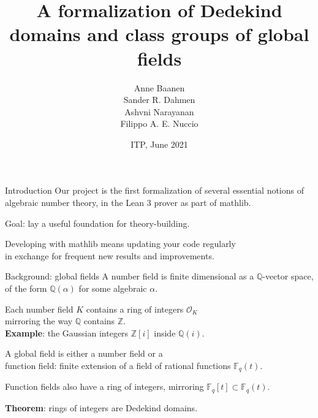 \documentclass{beamer}
\title{A formalization of Dedekind domains and class groups of global fields}
\author{Anne Baanen \\ Sander R. Dahmen \\ Ashvni Narayanan \\ Filippo A. E. Nuccio}
\date{ITP, June 2021}
\newcommand*{\OK}[1][K]{\mathcal{O}_{#1}}
\newcommand*{\Fq}[1][q]{\mathbb{F}_{#1}}
\newcommand{\mathlib}{\textsf{mathlib}\xspace}
\newcommand{\Q}{\mathbb{Q}}
\newcommand{\Z}{\mathbb{Z}}
\begin{document}
\begin{frame}
	\maketitle
\end{frame}

\begin{frame}{Introduction}
	Our project is the first formalization of several essential notions of
	\alert{algebraic number theory}, in the Lean 3 prover as part of \mathlib.

	Goal: lay a useful foundation for theory-building.

	Developing with \mathlib means updating your code regularly\\
	in exchange for frequent new results and improvements.
\end{frame}

\begin{frame}{Background: global fields}
	A \alert{number field} is finite dimensional as a $\Q$-vector space,\\
	of the form $\Q(\alpha)$ for some algebraic $\alpha$.

\pause
	Each number field $K$ contains a \alert{ring of integers} $\OK$\\
	mirroring the way $\Q$ contains $\Z$.\\
	\textbf{Example}: the Gaussian integers $\Z[i]$ inside $\Q(i)$.

\pause
	A \alert{global field} is either a \alert{number field} or a\\
	\alert{function field}: finite extension of a field of rational functions $\Fq(t)$.

	Function fields also have a ring of integers, mirroring $\Fq[q][t] \subset \Fq(t)$.

\pause
	\textbf{Theorem}: rings of integers are \alert{Dedekind domains}.
\end{frame}
\end{document}
